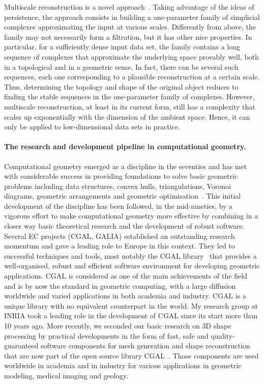 Multiscale reconstruction is a novel approach~\cite{geometrica-bgo-09}. Taking advantage of the ideas of persistence, the approach consists in building a one-parameter family of simplicial complexes approximating the input at various scales. Differently from above, the family may not necessarily form a filtration, but it has other nice properties. In particular, for a sufficiently dense input data set, the family contains a long sequence of complexes that approximate the underlying space provably well, both in a topological and in a geometric sense. In fact, there can be several such sequences, each one corresponding to a plausible reconstruction at a certain scale. Thus, determining the topology and shape of the original object reduces to finding the stable sequences in the one-parameter family of complexes.   However, multiscale reconstruction, at least in its current form, still has a complexity that scales up exponentially with the dimension of the ambient space. Hence, it can only be applied to low-dimensional data sets in practice.


\paragraph{The research and development pipeline in computational geometry.}
Computational geometry emerged as a discipline in the seventies and has met with considerable success in providing foundations to solve basic geometric problems including data structures, convex hulls, triangulations, Voronoi diagrams, geometric arrangements and geometric optimisation~\cite{by-ag-98}. This initial development of the discipline has been followed, in the mid-nineties, by a vigorous effort to make computational geometry more effective by
combining in a closer way basic theoretical research and the development of robust software.
Several EC projects (CGAL, GALIA) established an outstanding research momentum and gave a leading role to Europe in this context.  They led to successful techniques and tools, most notably the CGAL library~\cite{cgal}  that provides a well-organised, robust and efficient software environment for developing geometric applications. CGAL is considered as one of the main achievements of the field and is by now the standard in geometric computing, with a large diffusion worldwide and varied applications in both academia and industry. CGAL is a unique library with no equivalent counterpart in the world.  My research group at INRIA took a leading role in the development of CGAL since its start more than 10 years ago. More recently, we seconded our basic research on  3D shape processing by practical developments in the form of fast, safe and quality-guaranteed software components for mesh generation and shape reconstruction that are now part of the open source library CGAL~\cite{cgal:rty-m3-11}. Those components are used worldwide in academia and in industry for various applications in geometric modeling, medical imaging and geology.


